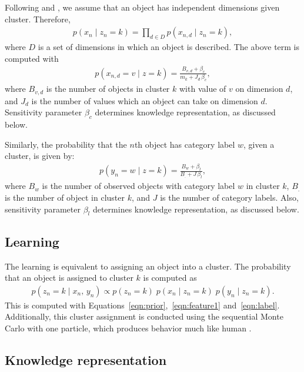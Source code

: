 \documentclass[doc]{apa6}
\begin{document}
Following \textcite{Anderson1991a} and \textcite{Sanborn2010a}, we assume that an object has
independent dimensions given cluster. Therefore,
\begin{align}
    p(x_{n} \; \vert \; z_{n} = k) = \prod_{d \in D} p(x_{n,d} \; \vert \; z_{n} = k),
\label{eqn:feature1}
\end{align}
where $D$ is a set of dimensions in which an object is described.  The above term is computed with
\begin{align}
    p(x_{n,d} = v \; \vert \; z = k) = \frac{B_{v,d} + \beta_{c}}{m_{k} + J_{d} \, \beta_{c}},
\label{eqn:feature2}
\end{align}
where $B_{v,d}$ is the number of objects in cluster $k$ with value of $v$ on dimension $d$, and
$J_{d}$ is the number of values which an object can take on dimension $d$. Sensitivity parameter
$\beta_{c}$ determines knowledge representation, as discussed below.

Similarly, the probability that the $n$th object has category label $w$, given a cluster, is given by:
\begin{align}
    p(y_{n} = w \; \vert \; z = k) = \frac{B_{w} + \beta_{l}}{B_{.} + J \, \beta_{l}},
\label{eqn:label}
\end{align}
where $B_{w}$ is the number of observed objects with category label $w$ in cluster $k$, $B_{.}$ is
the number of object in cluster $k$, and $J$ is the number of category labels. Also, sensitivity
parameter $\beta_{l}$ determines knowledge representation, as discussed below.


\subsection{Learning}

The learning is equivalent to assigning an object into a cluster. The probability that an object is
assigned to cluster $k$ is computed as
\begin{align}
    p(z_{n} = k \;\vert\; x_{n},\, y_{n}) \propto
    p(z_{n} = k)
    \;
    p(x_{n} \;\vert\; z_{n} = k)
    \;
    p(y_{n} \;\vert\; z_{n} = k).
\label{eqn:learning}
\end{align}
This is computed with Equations~\ref{eqn:prior},~\ref{eqn:feature1} and~\ref{eqn:label}.
Additionally, this cluster assignment is conducted using the sequential Monte Carlo with one
particle, which produces behavior much like human \parencite{Sanborn2010a}.


\subsection{Knowledge representation}
\end{document}
